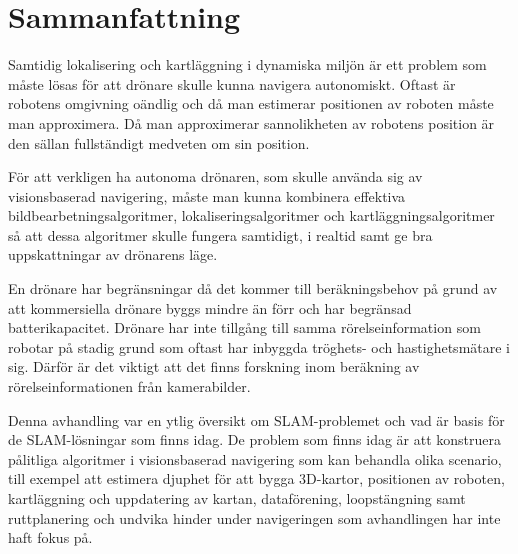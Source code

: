\chapter{Sammanfattning}

Samtidig lokalisering och kartläggning i dynamiska miljön är ett problem som måste lösas för att drönare skulle kunna navigera autonomiskt. Oftast är robotens omgivning oändlig och då man estimerar positionen av roboten måste man approximera. Då man approximerar sannolikheten av robotens position är den sällan fullständigt medveten om sin position. 

För att verkligen ha autonoma drönaren, som skulle använda sig av visionsbaserad navigering, måste man kunna kombinera effektiva bildbearbetningsalgoritmer, lokaliseringsalgoritmer och kartläggningsalgoritmer så att dessa algoritmer skulle fungera samtidigt, i realtid samt ge bra uppskattningar av drönarens läge. 

En drönare har begränsningar då det kommer till beräkningsbehov på grund av att kommersiella drönare byggs mindre än förr och har begränsad batterikapacitet. Drönare har inte tillgång till samma rörelseinformation som robotar på stadig grund som oftast har inbyggda tröghets- och hastighetsmätare i sig. Därför är det viktigt att det finns forskning inom beräkning av rörelseinformationen från kamerabilder. 

Denna avhandling var en ytlig översikt om SLAM-problemet och vad är basis för de SLAM-lösningar som finns idag. De problem som finns idag är att konstruera pålitliga algoritmer i visionsbaserad navigering som kan behandla olika scenario, till exempel att estimera djuphet för att bygga 3D-kartor, positionen av roboten, kartläggning och uppdatering av kartan, dataförening, loopstängning samt ruttplanering och undvika hinder under navigeringen som avhandlingen har inte haft fokus på.

